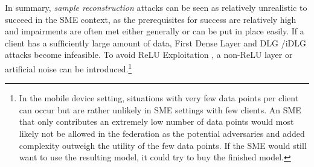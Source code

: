 In summary, \emph{sample reconstruction} attacks can be seen as relatively unrealistic to succeed in the SME context, as the prerequisites for success are relatively high and impairments are often met either generally or can be put in place easily. If a client has a sufficiently large amount of data, First Dense Layer \citep{aono2017privacyfirstdenselayer} and DLG \citep{zhu2020deepDLG}/iDLG \citep{zhao2020iDLG} attacks become infeasible. To avoid ReLU Exploitation \citep{sannai2018relureconstruction}, a non-ReLU layer or artificial noise can be introduced.\footnote{In the mobile device setting, situations with very few data points per client can occur but are rather unlikely in SME settings with few clients. An SME that only contributes an extremely low number of data points would most likely not be allowed in the federation as the potential adversaries and added complexity outweigh the utility of the few data points. If the SME would still want to use the resulting model, it could try to buy the finished model.}

